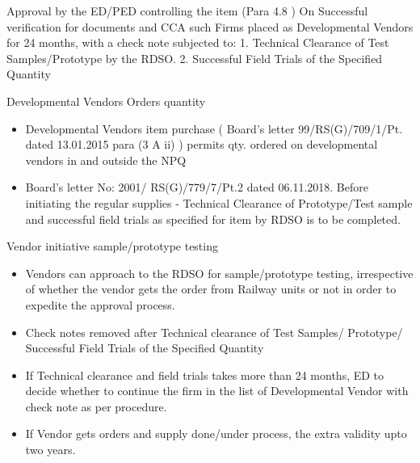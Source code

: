 \documentclass[
  10pt,
  ignorenonframetext,
  aspectratio=43,
]{beamer}
\providecommand{\tightlist}{%
  \setlength{\itemsep}{0pt}\setlength{\parskip}{0pt}}
\begin{document}
\begin{frame}{Approval by the ED/PED controlling the item (Para 4.8 )}
\protect\hypertarget{approval-by-the-edped-controlling-the-item-para-4.8}{}
On Successful verification for documents and CCA such Firms placed as
Developmental Vendors for 24 months, with a check note subjected to: 1.
Technical Clearance of Test Samples/Prototype by the RDSO. 2. Successful
Field Trials of the Specified Quantity

\begin{block}{Developmental Vendors Orders quantity}
\protect\hypertarget{developmental-vendors-orders-quantity}{}
\begin{itemize}
\tightlist
\item
  Developmental Vendors item purchase ( Board's letter
  99/RS(G)/709/1/Pt. dated 13.01.2015 para (3 A ii) ) permits qty.
  ordered on developmental vendors in and outside the NPQ
\item
  Board's letter No: 2001/ RS(G)/779/7/Pt.2 dated 06.11.2018. Before
  initiating the regular supplies - Technical Clearance of
  Prototype/Test sample and successful field trials as specified for
  item by RDSO is to be completed.
\end{itemize}
\end{block}
\end{frame}

\begin{frame}
\begin{block}{Vendor initiative sample/prototype testing}
\protect\hypertarget{vendor-initiative-sampleprototype-testing}{}
\begin{itemize}
\item
  Vendors can approach to the RDSO for sample/prototype testing,
  irrespective of whether the vendor gets the order from Railway units
  or not in order to expedite the approval process.
\item
  Check notes removed after Technical clearance of Test Samples/
  Prototype/ Successful Field Trials of the Specified Quantity
\item
  If Technical clearance and field trials takes more than 24 months, ED
  to decide whether to continue the firm in the list of Developmental
  Vendor with check note as per procedure.
\item
  If Vendor gets orders and supply done/under process, the extra
  validity upto two years.
\end{itemize}
\end{block}
\end{frame}
\end{document}
